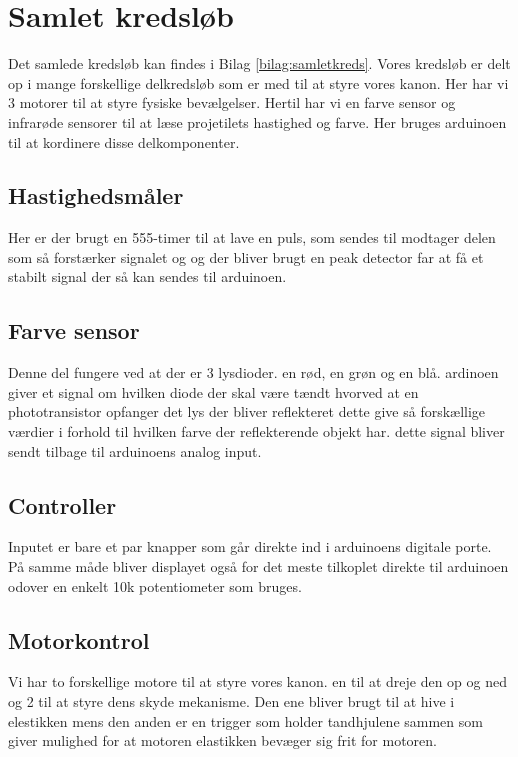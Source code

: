 \section{Samlet kredsløb}
Det samlede kredsløb kan findes i Bilag \ref{bilag:samletkreds}.
Vores kredsløb er delt op i mange forskellige delkredsløb som er med til at styre vores kanon. Her har vi 3 motorer til at styre fysiske bevælgelser. Hertil har vi en farve sensor og infrarøde sensorer til at læse projetilets hastighed og farve. Her bruges arduinoen til at kordinere disse delkomponenter.


\subsection{Hastighedsmåler}
Her er der brugt en 555-timer til at lave en puls, som sendes til modtager delen som så forstærker signalet og og der bliver brugt en peak detector far at få et stabilt signal der så kan sendes til arduinoen.
 \subsection{Farve sensor}
Denne del fungere ved at der er 3 lysdioder. en rød, en grøn og en blå. ardinoen giver et signal om hvilken diode der skal være tændt hvorved at en phototransistor opfanger det lys der bliver reflekteret dette give så forskællige værdier i forhold til hvilken farve der reflekterende objekt har. dette signal bliver sendt tilbage til arduinoens analog input.
\subsection{Controller}
Inputet er bare et par knapper som går direkte ind i arduinoens digitale porte.
På samme måde bliver displayet også for det meste tilkoplet direkte til arduinoen odover en enkelt 10k potentiometer som bruges.
\subsection{Motorkontrol}

Vi har to forskellige motore til at styre vores kanon. en til at dreje den op og ned og 2 til at styre dens skyde mekanisme. Den ene bliver brugt til at hive i elestikken mens den anden er en trigger som holder tandhjulene sammen som giver mulighed for at motoren elastikken bevæger sig frit for motoren.

